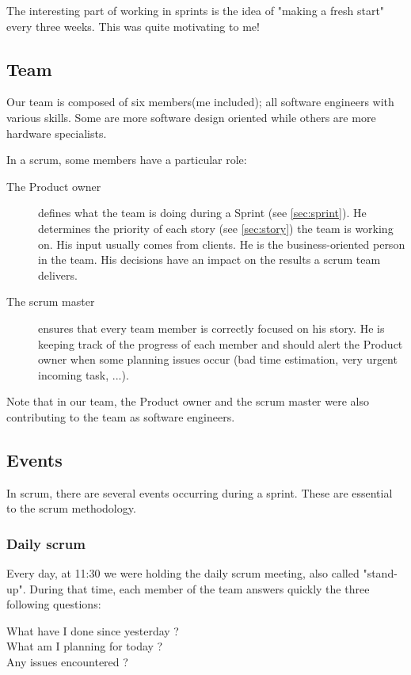 The interesting part of working in sprints is the idea of "making a fresh start" every three weeks. This
was quite motivating to me!


\subsection{Team}
Our team is composed of six members(me included); all software engineers with various
skills. Some are more software design oriented while others are more hardware
specialists.

In a \gls{scrum}, some members have a particular role:
\begin{description}
    \item[The Product owner]
        defines what the team is doing during a Sprint (see \ref{sec:sprint}).
        He determines the priority of each story (see \ref{sec:story}) the team is working on. His input usually comes from
        clients. He is the business-oriented person in the team. His decisions have an impact on the results a \gls{scrum} team delivers.
    \item[The scrum master]
        ensures that every team member is correctly focused on his story. He is keeping track of the progress of each member and
        should alert the Product owner when some planning issues occur (bad time estimation, very urgent incoming task, ...).
\end{description}

Note that in our team, the Product owner and the \gls{scrum} master were also contributing to the team as software engineers.

\subsection{Events}
In \gls{scrum}, there are several events occurring during a sprint.
These are essential to the \gls{scrum} methodology.

\subsubsection{Daily scrum}
Every day, at 11:30 we were holding the daily \gls{scrum} meeting, also called "stand-up".
During that time, each member of the team answers quickly the three following questions:

\begin{description}
    \item[What have I done since yesterday ?]
    \item[What am I planning for today ?]
    \item[Any issues encountered ?]
\end{description}

